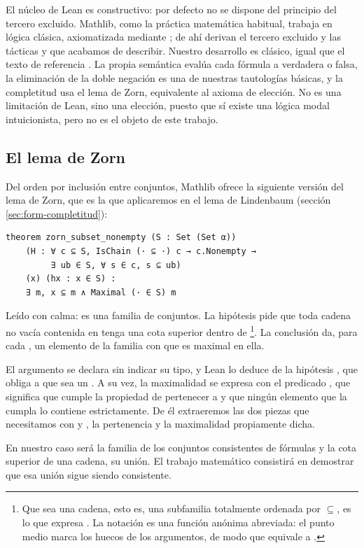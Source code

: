 El núcleo de Lean es constructivo: por defecto no se dispone del principio del tercero excluido. Mathlib, como la práctica matemática habitual, trabaja en lógica clásica, axiomatizada mediante ; de ahí derivan el tercero excluido y las tácticas  y  que acabamos de describir. Nuestro desarrollo es clásico, igual que el texto de referencia \cite{blackburn}. La propia semántica evalúa cada fórmula a verdadera o falsa, la eliminación de la doble negación es una de nuestras tautologías básicas, y la completitud usa el lema de Zorn, equivalente al axioma de elección. No es una limitación de Lean, sino una elección, puesto que sí existe una lógica modal intuicionista, pero no es el objeto de este trabajo.

\subsection*{El lema de Zorn}

Del orden por inclusión entre conjuntos, Mathlib ofrece la siguiente versión del lema de Zorn, que es la que aplicaremos en el lema de Lindenbaum (sección \ref{sec:form-completitud}):

\begin{lstlisting}
theorem zorn_subset_nonempty (S : Set (Set α))
    (H : ∀ c ⊆ S, IsChain (· ⊆ ·) c → c.Nonempty →
         ∃ ub ∈ S, ∀ s ∈ c, s ⊆ ub)
    (x) (hx : x ∈ S) :
    ∃ m, x ⊆ m ∧ Maximal (· ∈ S) m
\end{lstlisting}

Leído con calma:  es una familia de conjuntos. La hipótesis  pide que toda cadena no vacía  contenida en  tenga una cota superior dentro de \footnote{Que  sea una cadena, esto es, una subfamilia totalmente ordenada por $\subseteq$, es lo que expresa . La notación  es una función anónima abreviada: el punto medio marca los huecos de los argumentos, de modo que equivale a .}. La conclusión da, para cada , un elemento  de la familia con  que es maximal en ella.

El argumento  se declara sin indicar su tipo, y Lean lo deduce de la hipótesis , que obliga a que sea un . A su vez, la maximalidad se expresa con el predicado , que significa que  cumple la propiedad de pertenecer a  y que ningún elemento que la cumpla lo contiene estrictamente. De él extraeremos las dos piezas que necesitamos con  y , la pertenencia y la maximalidad propiamente dicha.

En nuestro caso  será la familia de los conjuntos consistentes de fórmulas y la cota superior de una cadena, su unión. El trabajo matemático consistirá en demostrar que esa unión sigue siendo consistente.